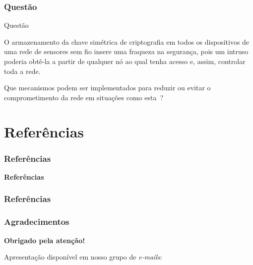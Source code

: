 \documentclass[notes]{beamer}
\begin{document}
\begin{frame}
\label{slide_079}
\frametitle{Questão}

\begin{block}{Questão}

O armazenamento da chave simétrica de criptografia em todos os dispositivos de uma rede de sensores sem fio insere uma fraqueza na segurança, pois um intruso poderia obtê-la a partir de qualquer nó ao qual tenha acesso e, assim, controlar toda a rede.

\end{block} \pause

\begin{block}

Que mecanismos podem ser implementados para reduzir ou evitar o comprometimento da rede em situações como esta~\nocite{Clicia}?

\end{block}

\end{frame}

\section{Referências}
\begin{frame}
\label{slide_080}
\frametitle{Referências}

\begin{block}

 \center \textbf{Referências}

\end{block}

\end{frame}

\begin{frame}[allowframebreaks]
\label{slide_81}
\frametitle{Referências}




\end{frame}

\begin{frame}
\label{slide_82}
\frametitle{Agradecimentos}
\vskip20pt

\begin{center}
{\bf \color{alert} Obrigado pela atenção!}
\end{center}

\vskip20pt

\begin{center}
Apresentação disponível em nosso grupo de \textit{e-mails}:\\
\vskip12pt
\end{center}

\titlepage
\end{frame}
\end{document}
